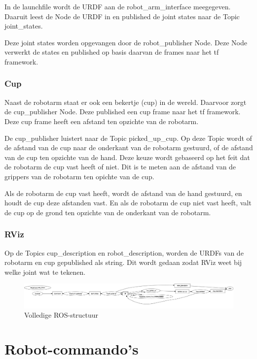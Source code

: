 \documentclass[12pt, legalpaper]{article}
\begin{document}
    In de launchfile wordt de URDF aan de robot\_arm\_interface meegegeven. Daaruit leest de Node de URDF in en published de joint states naar de Topic joint\_states.

    Deze joint states worden opgevangen door de robot\_publisher Node. Deze Node verwerkt de states en published op basis daarvan de frames naar het tf framework.

    \subsubsection{Cup}
    Naast de robotarm staat er ook een bekertje (cup) in de wereld.
    Daarvoor zorgt de cup\_publisher Node. Deze published een cup frame naar het tf framework.
    Deze cup frame heeft een afstand ten opzichte van de robotarm. 
    
    De cup\_publisher luistert naar de Topic picked\_up\_cup. Op deze Topic wordt of de afstand van de cup naar de onderkant van de robotarm gestuurd, of de afstand van de cup ten opzichte van de hand.
    Deze keuze wordt gebaseerd op het feit dat de robotarm de cup vast heeft of niet.
    Dit is te meten aan de afstand van de grippers van de robotarm ten opichte van de cup.
    
    Als de robotarm de cup vast heeft, wordt de afstand van de hand gestuurd, en houdt de cup deze afstanden vast.
    En als de robotarm de cup niet vast heeft, valt de cup op de grond ten opzichte van de onderkant van de robotarm.

    \subsubsection{RViz}
    Op de Topics cup\_description en robot\_description, worden de URDFs van de robotarm en cup gepublished als string.
    Dit wordt gedaan zodat RViz weet bij welke joint wat te tekenen.


    \begin{figure}
        \includegraphics[width=1\textwidth]{rosgraph}
        \caption{Volledige ROS-structuur}
        \label{fig:full-structure}
    \end{figure}

    \newpage

    \section{Robot-commando's}
    \label{commands}


    
\end{document}
